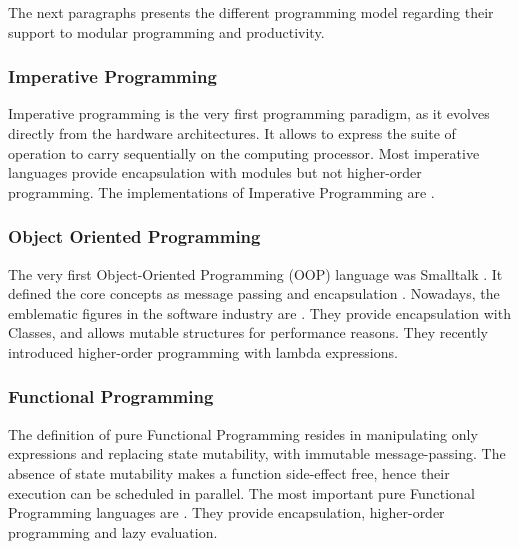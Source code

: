 The next paragraphs presents the different programming model regarding their support to modular programming and productivity.

\subsubsection{Imperative Programming}


Imperative programming is the very first programming paradigm, as it evolves directly from the hardware architectures.
It allows to express the suite of operation to carry sequentially on the computing processor.
Most imperative languages provide encapsulation with modules but not higher-order programming. %
The implementations of Imperative Programming are .

\subsubsection{Object Oriented Programming}


The very first Object-Oriented Programming (OOP) language was Smalltalk \cite{Goldberg1984}.
It defined the core concepts as message passing and encapsulation %
.
Nowadays, the emblematic figures in the software industry are .
They provide encapsulation with Classes, and allows mutable structures for performance reasons.
They recently introduced higher-order programming with lambda expressions.

\subsubsection{Functional Programming} \label{chapter3:software-productivity:programming-models:functional-programming}


The definition of pure Functional Programming resides in manipulating only expressions and replacing state mutability, with immutable message-passing.
The absence of state mutability makes a function side-effect free, hence their execution can be scheduled in parallel.
The most important pure Functional Programming languages are .
They provide encapsulation, higher-order programming and lazy evaluation.

